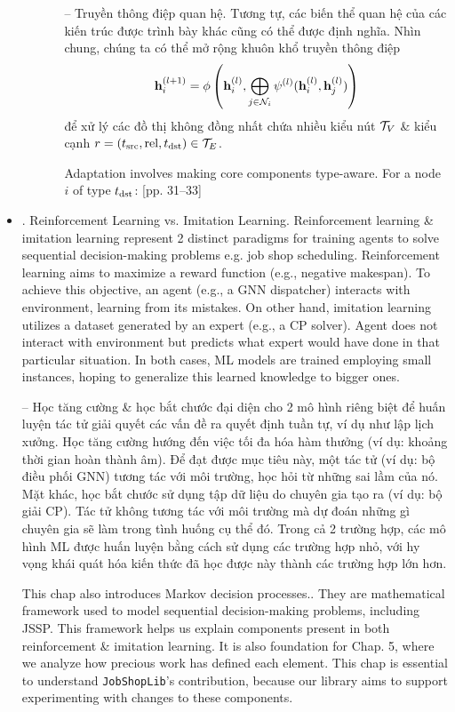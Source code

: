 \documentclass{article}
\begin{document}
\begin{itemize}
\begin{itemize}
\begin{itemize}
            -- {\sf Truyền thông điệp quan hệ.} Tương tự, các biến thể quan hệ của các kiến trúc được trình bày khác cũng có thể được định nghĩa. Nhìn chung, chúng ta có thể mở rộng khuôn khổ truyền thông điệp
            \begin{equation*}
                {\bf h}_i^{(l + 1)} = \phi\left({\bf h}_i^{(l)},\bigoplus_{j\in{\cal N}_i} \psi^{(l)}({\bf h}_i^{(l)},{\bf h}_j^{(l)})\right)
            \end{equation*}
            để xử lý các đồ thị không đồng nhất chứa nhiều kiểu nút ${\cal T}_V$ \& kiểu cạnh $r = (t_{\rm src},{\rm rel},t_{\rm dst})\in{\cal T}_E$.

            Adaptation involves making core components type-aware. For a node $i$ of type $t_{\rm dst}$: [pp. 31--33]
        \end{itemize}
    \end{itemize}
    \item {. Reinforcement Learning vs. Imitation Learning.} Reinforcement learning \& imitation learning represent 2 distinct paradigms for training agents to solve sequential decision-making problems e.g. job shop scheduling. Reinforcement learning aims to maximize a reward function (e.g., negative makespan). To achieve this objective, an agent (e.g., a GNN dispatcher) interacts with environment, learning from its mistakes. On other hand, imitation learning utilizes a dataset generated by an expert (e.g., a CP solver). Agent does not interact with environment but predicts what expert would have done in that particular situation. In both cases, ML models are trained employing small instances, hoping to generalize this learned knowledge to bigger ones.

    -- Học tăng cường \& học bắt chước đại diện cho 2 mô hình riêng biệt để huấn luyện tác tử giải quyết các vấn đề ra quyết định tuần tự, ví dụ như lập lịch xưởng. Học tăng cường hướng đến việc tối đa hóa hàm thưởng (ví dụ: khoảng thời gian hoàn thành âm). Để đạt được mục tiêu này, một tác tử (ví dụ: bộ điều phối GNN) tương tác với môi trường, học hỏi từ những sai lầm của nó. Mặt khác, học bắt chước sử dụng tập dữ liệu do chuyên gia tạo ra (ví dụ: bộ giải CP). Tác tử không tương tác với môi trường mà dự đoán những gì chuyên gia sẽ làm trong tình huống cụ thể đó. Trong cả 2 trường hợp, các mô hình ML được huấn luyện bằng cách sử dụng các trường hợp nhỏ, với hy vọng khái quát hóa kiến thức đã học được này thành các trường hợp lớn hơn.

    This chap also introduces Markov decision processes.. They are mathematical framework used to model sequential decision-making problems, including JSSP. This framework helps us explain components present in both reinforcement \& imitation learning. It is also foundation for Chap. 5, where we analyze how precious work has defined each element. This chap is essential to understand {\tt JobShopLib}'s contribution, because our library aims to support experimenting with changes to these components.


\end{itemize}
\end{document}
